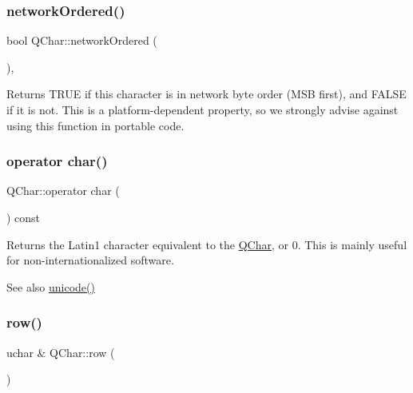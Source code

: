 \subsubsection{\texorpdfstring{networkOrdered()}{networkOrdered()}}
{\footnotesize\ttfamily bool Q\+Char\+::network\+Ordered (\begin{DoxyParamCaption}{ }\end{DoxyParamCaption})\hspace{0.3cm}{\ttfamily [inline]}, {\ttfamily [static]}}

Returns T\+R\+UE if this character is in network byte order (M\+SB first), and F\+A\+L\+SE if it is not. This is a platform-\/dependent property, so we strongly advise against using this function in portable code. \mbox{\label{class_q_char_a12f9d4ead9f902d34de220b02e5e513d}} 
\subsubsection{\texorpdfstring{operator char()}{operator char()}}
{\footnotesize\ttfamily Q\+Char\+::operator char (\begin{DoxyParamCaption}{ }\end{DoxyParamCaption}) const\hspace{0.3cm}{\ttfamily [inline]}}

Returns the Latin1 character equivalent to the \mbox{\hyperlink{class_q_char}{Q\+Char}}, or 0. This is mainly useful for non-\/internationalized software.

\begin{DoxySeeAlso}{See also}
\mbox{\hyperlink{class_q_char_a0fd3d9a4b10d8f6482c5ebd8053b69a8}{unicode()}} 
\end{DoxySeeAlso}
\mbox{\label{class_q_char_a8f987c65692f95eebc84bf687ea92aff}} 
\subsubsection{\texorpdfstring{row()}{row()}\hspace{0.1cm}{\footnotesize\ttfamily [1/2]}}
{\footnotesize\ttfamily uchar \& Q\+Char\+::row (\begin{DoxyParamCaption}{ }\end{DoxyParamCaption})\hspace{0.3cm}{\ttfamily [inline]}}

